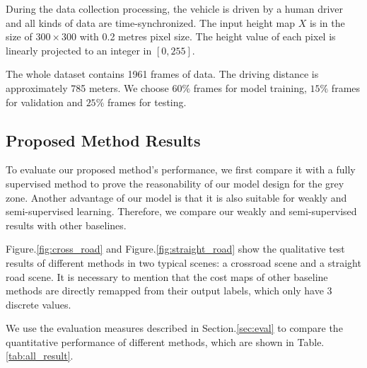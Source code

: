 \documentclass[letterpaper, 10 pt, conference]{ieeeconf}  %
\begin{document}
During the data collection processing, the vehicle is driven by a human driver and all kinds of data are time-synchronized. The input height map $X$ is in the size of $300\times 300$ with 0.2 metres pixel size. The height value of each pixel is linearly projected to an integer in $[0,255]$.

The whole dataset contains 1961 frames of data. The driving distance is approximately 785 meters. We choose $60\%$ frames for model training, $15\%$ frames for validation and $25\%$ frames for testing.

\subsection{Proposed Method Results}
To evaluate our proposed method's performance, we first compare it with a fully supervised method to prove the reasonability of our model design for the grey zone. Another advantage of our model is that it is also suitable for weakly and semi-supervised learning. Therefore, we compare our weakly and semi-supervised results with other baselines.

Figure.\ref{fig:cross_road} and Figure.\ref{fig:straight_road} show the qualitative test results of different methods in two typical scenes: a crossroad scene and a straight road scene. It is necessary to mention that the cost maps of other baseline methods are directly remapped from their output labels, which only have 3 discrete values.

We use the evaluation measures described in Section.\ref{sec:eval} to compare the quantitative performance of different methods, which are shown in Table.\ref{tab:all_result}. 
\end{document}
